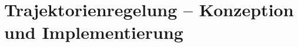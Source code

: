 \section{Trajektorienregelung -- Konzeption und Implementierung}
\label{sec:trajektorienregelung}
%
